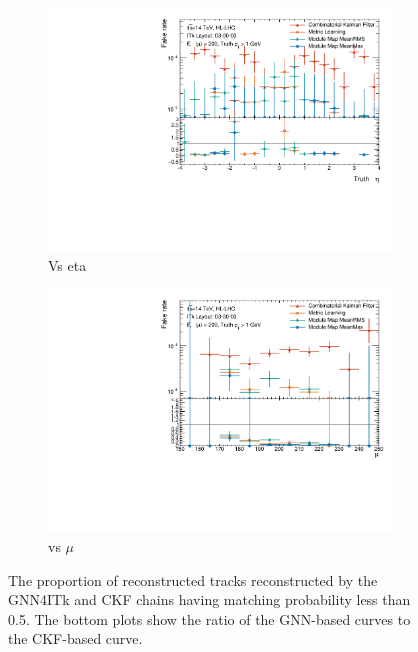 \begin{figure}[h!]
\centering
\begin{subfigure}[b]{0.75\textwidth}
    \centering
    \includegraphics[width=\textwidth]{figures/ckf-gnn/FakeRate/fakerate_vs_eta.pdf}
    \caption{Vs eta}
    \label{subfig:tracking-fake-eta}
\end{subfigure}
\begin{subfigure}[b]{0.75\textwidth}
    \centering
    \includegraphics[width=\textwidth]{figures/ckf-gnn/FakeRate/fakerate_vs_mu.pdf}
    \caption{vs $\mu$}
    \label{subfig:tracking-fake-mu}
\end{subfigure}
    \caption{The proportion of reconstructed tracks reconstructed by the GNN4ITk and CKF chains having matching probability less than 0.5. The bottom plots show the ratio of the GNN-based curves to the CKF-based curve.}
    \label{fig:tracking-fake-eta-mu}
\end{figure}

